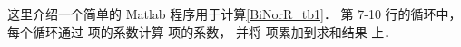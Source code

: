 

这里介绍一个简单的 Matlab 程序用于计算\autoref{BiNorR_tb1}． 第 7-10 行的循环中， 每个循环通过  项的系数计算  项的系数， 并将  项累加到求和结果  上．

